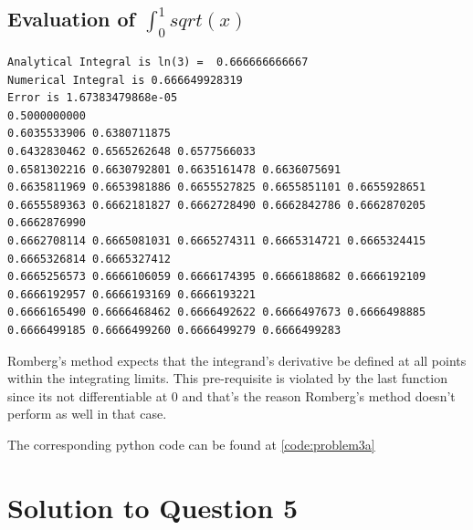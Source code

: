\documentclass[a4paper,11pt]{article}
\begin{document}
\subsection{Evaluation of $\int_{0}^{1} sqrt(x)$}
\begin{lstlisting}
Analytical Integral is ln(3) =  0.666666666667
Numerical Integral is 0.666649928319
Error is 1.67383479868e-05
0.5000000000
0.6035533906 0.6380711875
0.6432830462 0.6565262648 0.6577566033
0.6581302216 0.6630792801 0.6635161478 0.6636075691
0.6635811969 0.6653981886 0.6655527825 0.6655851101 0.6655928651
0.6655589363 0.6662181827 0.6662728490 0.6662842786 0.6662870205 0.6662876990
0.6662708114 0.6665081031 0.6665274311 0.6665314721 0.6665324415 0.6665326814 0.6665327412
0.6665256573 0.6666106059 0.6666174395 0.6666188682 0.6666192109 0.6666192957 0.6666193169 0.6666193221
0.6666165490 0.6666468462 0.6666492622 0.6666497673 0.6666498885 0.6666499185 0.6666499260 0.6666499279 0.6666499283
\end{lstlisting}

Romberg's method expects that the integrand's derivative be defined at all points within the integrating limits. This pre-requisite is violated by the last function since its not differentiable at 0 and that's the reason Romberg's method doesn't perform as well in that case.

The corresponding python code can be found at \ref{code:problem3a}
 
\section{Solution to Question 5}\label{prob3b}
	
\end{document}
